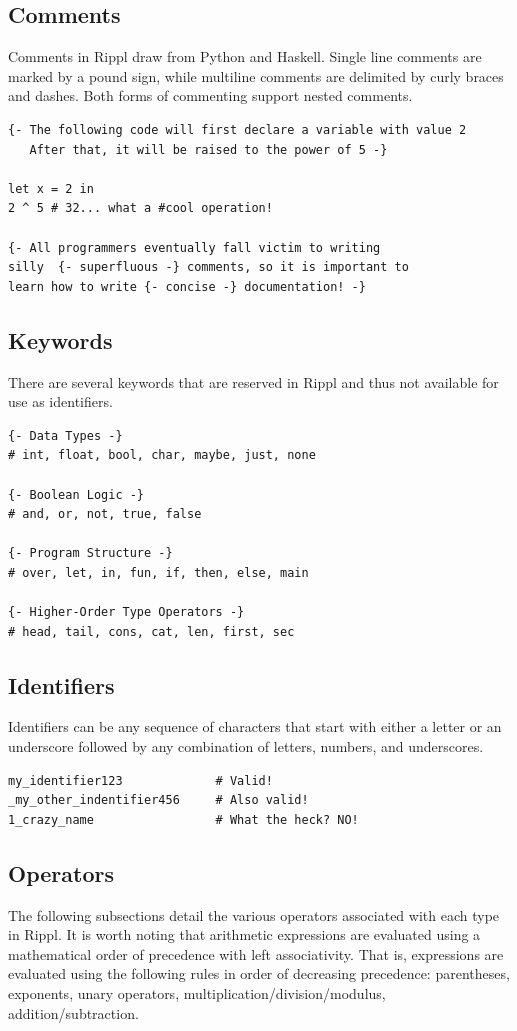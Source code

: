 \documentclass[5pt]{article}
\begin{document}
\newpage 
\subsection{Comments}
Comments in Rippl draw from Python and Haskell. Single line comments are marked by a pound sign, while multiline comments are delimited by curly braces and dashes. Both forms of commenting support nested comments.
\begin{lstlisting}[language=rippl]
{- The following code will first declare a variable with value 2
   After that, it will be raised to the power of 5 -}
   
let x = 2 in
2 ^ 5 # 32... what a #cool operation!

{- All programmers eventually fall victim to writing 
silly  {- superfluous -} comments, so it is important to 
learn how to write {- concise -} documentation! -}
\end{lstlisting}
\subsection{Keywords}
There are several keywords that are reserved in Rippl and thus not available for use as identifiers.
\begin{lstlisting}[language=rippl]
{- Data Types -}
# int, float, bool, char, maybe, just, none

{- Boolean Logic -}
# and, or, not, true, false

{- Program Structure -}
# over, let, in, fun, if, then, else, main

{- Higher-Order Type Operators -}
# head, tail, cons, cat, len, first, sec
\end{lstlisting}
\subsection{Identifiers}
Identifiers can be any sequence of characters that start with either a letter or an underscore followed by any combination of letters, numbers, and underscores.
\begin{lstlisting}[language=rippl]
my_identifier123             # Valid!
_my_other_indentifier456     # Also valid!
1_crazy_name                 # What the heck? NO!
\end{lstlisting}
\newpage
\subsection{Operators}
The following subsections detail the various operators associated with each type in Rippl. It is worth noting that arithmetic expressions are evaluated using a mathematical
order of precedence with left associativity. That is, expressions are evaluated using the following rules in order of decreasing precedence: parentheses, exponents, unary operators, multiplication/division/modulus, addition/subtraction. 
\end{document}
